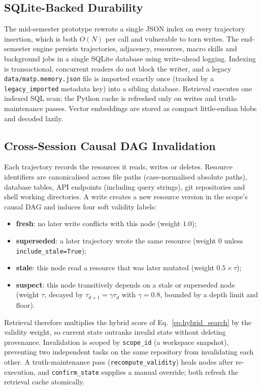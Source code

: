 \documentclass[lettersize,journal]{IEEEtran}
\begin{document}
\subsection{SQLite-Backed Durability}

The mid-semester prototype rewrote a single JSON index on every trajectory insertion, which is both $O(N)$ per call and vulnerable to torn writes. The end-semester engine persists trajectories, adjacency, resources, macro skills and background jobs in a single SQLite database using write-ahead logging. Indexing is transactional, concurrent readers do not block the writer, and a legacy \texttt{data/matp.memory.json} file is imported exactly once (tracked by a \texttt{legacy\_imported} metadata key) into a sibling database. Retrieval executes one indexed SQL scan; the Python cache is refreshed only on writes and truth-maintenance passes. Vector embeddings are stored as compact little-endian blobs and decoded lazily.

\subsection{Cross-Session Causal DAG Invalidation}
\label{sec:dag}

Each trajectory records the resources it reads, writes or deletes. Resource identifiers are canonicalised across file paths (case-normalised absolute paths), database tables, API endpoints (including query strings), git repositories and shell working directories. A write creates a new resource version in the scope's causal DAG and induces four soft validity labels:
\begin{itemize}
    \item \textbf{fresh}: no later write conflicts with this node (weight $1.0$);
    \item \textbf{superseded}: a later trajectory wrote the same resource (weight $0$ unless \texttt{include\_stale=True});
    \item \textbf{stale}: this node read a resource that was later mutated (weight $0.5 \times \tau$);
    \item \textbf{suspect}: this node transitively depends on a stale or superseded node (weight $\tau$, decayed by $\tau_{d+1} = \gamma \tau_d$ with $\gamma = 0.8$, bounded by a depth limit and floor).
\end{itemize}
Retrieval therefore multiplies the hybrid score of Eq.~\eqref{eq:hybrid_search} by the validity weight, so current state outranks invalid state without deleting provenance. Invalidation is scoped by \texttt{scope\_id} (a workspace snapshot), preventing two independent tasks on the same repository from invalidating each other. A truth-maintenance pass (\texttt{recompute\_validity}) heals nodes after re-execution, and \texttt{confirm\_state} supplies a manual override; both refresh the retrieval cache atomically.
\end{document}

